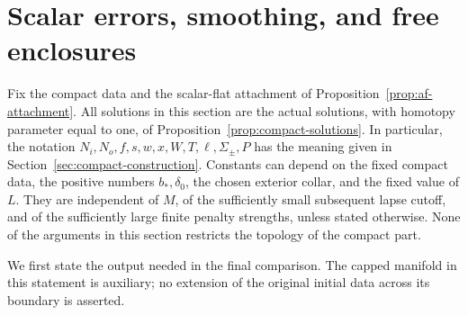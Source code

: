 \section{Scalar errors, smoothing, and free enclosures}
\label{sec:scalar-error}

Fix the compact data and the scalar-flat attachment of
Proposition~\ref{prop:af-attachment}.  All solutions in this section are
the actual solutions, with homotopy parameter equal to one, of
Proposition~\ref{prop:compact-solutions}.  In particular, the notation
\(N_i,N_o,f,s,w,x,W,T,\ell,\Sigma_\pm,P\) has the meaning given in
Section~\ref{sec:compact-construction}.  Constants can depend on the fixed
compact data, the positive numbers \(b_*,\delta_0\), the chosen exterior
collar, and the fixed value of \(L\).  They are independent of \(M\), of
the sufficiently small subsequent lapse cutoff, and of the sufficiently
large finite penalty strengths, unless stated otherwise.  None of the
arguments in this section restricts the topology of the compact part.

We first state the output needed in the final comparison.  The capped
manifold in this statement is auxiliary; no extension of the original
initial data across its boundary is asserted.

